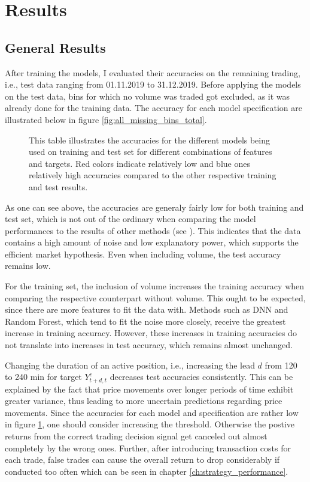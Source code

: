 \section{Results}

\subsection{General Results}

After training the models, I evaluated their accuracies on the remaining trading, i.e., test data ranging from 01.11.2019 to 31.12.2019.
Before applying the models on the test data, bins for which no volume was traded got excluded, as it was already done for the training data.
The accuracy for each model specification are illustrated below in figure \ref{fig:all_missing_bins_total}.

\begin{figure}[H]
    \captionsetup{format=plain}
    \caption{ 
        This table illustrates the accuracies for the different models being used on training
        and test set for different combinations of features and targets. 
        Red colors indicate relatively low and blue ones relatively high accuracies compared to the other respective training and test results.
    }
    \label{fig:all_accuracy_train_test}
\end{figure}


As one can see above, the accuracies are generaly fairly low for both training and test set,
which is not out of the ordinary when comparing the model performances to the results of other methods (see \cite{mcnally2018predictBTC}).
This indicates that the data contains a high amount of noise and low explanatory power, 
which supports the efficient market hypothesis. Even when including volume, the test accuracy remains low.

For the training set, the inclusion of volume increases the training accuracy when comparing the respective counterpart without volume.
This ought to be expected, since there are more features to fit the data with.
Methods such as DNN and Random Forest, which tend to fit the noise more closely, 
receive the greatest increase in training accuracy.
However, these increases in training accuracies do not translate into increases in test accuracy, which remains almost unchanged.

Changing the duration of an active position, i.e., increasing the lead $d$ from 120 to 240 min for target $ Y^{c}_{t + d, t} $ decreases test accuracies consistently.
This can be explained by the fact that price movements over longer periods of time exhibit greater variance,
thus leading to more uncertain predictions regarding price movements.
Since the accuracies for each model and specification are rather low in figure \ref{fig:all_accuracy_train_test}, 
one should consider increasing the threshold. Otherwise the postive returns from the correct trading decision signal get canceled out almost completely by the wrong ones.
Further, after introducing transaction costs for each trade, false trades can cause the overall return to drop considerably if conducted too often
which can be seen in chapter \ref{ch:strategy_performance}.


